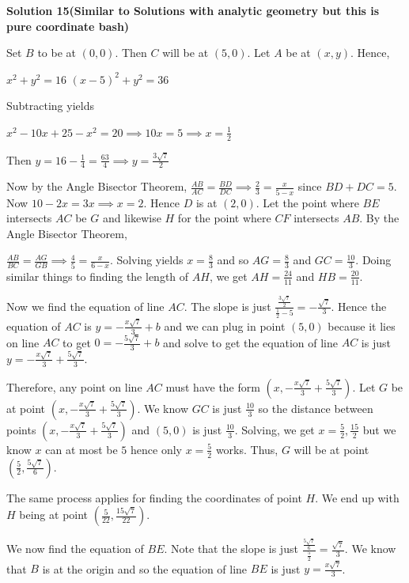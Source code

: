 \begin{enumerate}
\textbf{Solution 15(Similar to Solutions with analytic geometry but this is pure coordinate bash)}

Set $B$ to be at $(0, 0)$. Then $C$ will be at $(5, 0)$. Let $A$ be at $(x, y)$. Hence, 

 $x^{2} + y^{2} = 16$
$(x - 5)^{2} + y^{2} = 36$

 Subtracting yields

 $x^{2} - 10x + 25 - x^{2} = 20 \implies 10x = 5 \implies x = \frac{1}{2}$

 Then $y = 16 - \frac{1}{4} = \frac{63}{4} \implies y = \frac{3\sqrt{7}}{2}$

 Now by the Angle Bisector Theorem, $\frac{AB}{AC} = \frac{BD}{DC} \implies \frac{2}{3} = \frac{x}{5 - x}$ since $BD + DC = 5$. Now $10 - 2x = 3x \implies x = 2$. Hence $D$ is at $(2, 0)$. Let the point where $BE$ intersects $AC$ be $G$ and likewise $H$ for the point where $CF$ intersects $AB$. By the Angle Bisector Theorem, 

 $\frac{AB}{BC} = \frac{AG}{GB} \implies \frac{4}{5} = \frac{x}{6 - x}$. Solving yields $x = \frac{8}{3}$ and so $AG = \frac{8}{3}$ and $GC = \frac{10}{3}$. Doing similar things to finding the length of $AH$, we get $AH = \frac{24}{11}$ and $HB = \frac{20}{11}$. 

 Now we find the equation of line $AC$. The slope is just $\frac{\frac{3\sqrt{7}}{2}}{\frac{1}{2} - 5} = -\frac{\sqrt{7}}{3}$. Hence the equation of $AC$ is $y = -\frac{x\sqrt{7}}{3} + b$ and we can plug in point $(5, 0)$ because it lies on line $AC$ to get $0 = -\frac{5\sqrt{7}}{3} + b$ and solve to get the equation of line $AC$ is just $y = -\frac{x\sqrt{7}}{3} + \frac{5\sqrt{7}}{3}$.

 Therefore, any point on line $AC$ must have the form $(x, -\frac{x\sqrt{7}}{3} + \frac{5\sqrt{7}}{3})$. Let $G$ be at point $(x, -\frac{x\sqrt{7}}{3} + \frac{5\sqrt{7}}{3})$. We know $GC$ is just $\frac{10}{3}$ so the distance between points $(x, -\frac{x\sqrt{7}}{3} + \frac{5\sqrt{7}}{3})$ and $(5, 0)$ is just $\frac{10}{3}$. Solving, we get $x = \frac{5}{2}, \frac{15}{2}$ but we know $x$ can at most be $5$ hence only $x = \frac{5}{2}$ works. Thus, $G$ will be at point $(\frac{5}{2}, \frac{5\sqrt{7}}{6})$. 

 The same process applies for finding the coordinates of point $H$. We end up with $H$ being at point $(\frac{5}{22}, \frac{15\sqrt{7}}{22})$.

 
We now find the equation of $BE$. Note that the slope is just $\frac{\frac{5\sqrt{7}}{6}}{\frac{5}{2}} = \frac{\sqrt{7}}{3}$. We know that $B$ is at the origin and so the equation of line $BE$ is just $y = \frac{x\sqrt{7}}{3}$. 


\end{enumerate}
